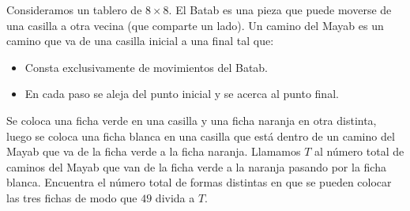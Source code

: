 Consideramos un tablero de $8 \times  8$. El Batab es una pieza que puede moverse de una casilla a otra vecina (que comparte un lado). Un camino del Mayab es un camino que va de una casilla inicial a una final tal que:
 \begin{itemize} 
 \item  Consta exclusivamente de movimientos del Batab. 
 \item  En cada paso se aleja del punto inicial y se acerca al punto final.
 \end{itemize} 
Se coloca una ficha verde en una casilla y una ficha naranja en otra distinta, luego se coloca una ficha blanca en una casilla que está dentro de un camino del Mayab que va de la ficha verde a la ficha naranja. Llamamos $T$ al número total de caminos del Mayab que van de la ficha verde a la naranja pasando por la ficha blanca. Encuentra el número total de formas distintas en que se pueden colocar las tres fichas de modo que $49$ divida a $T$.